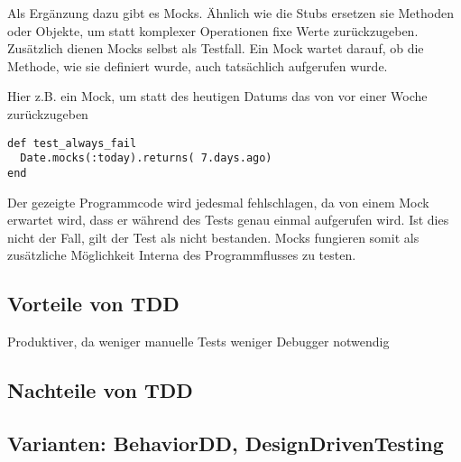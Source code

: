   Als Ergänzung dazu gibt es Mocks. Ähnlich wie die Stubs ersetzen sie Methoden oder Objekte, um statt komplexer Operationen fixe Werte zurückzugeben. Zusätzlich dienen Mocks selbst als Testfall. Ein Mock wartet darauf, ob die Methode, wie sie definiert wurde, auch tatsächlich aufgerufen wurde.
  
  Hier z.B. ein Mock, um statt des heutigen Datums das von vor einer Woche zurückzugeben
  \begin{lstlisting}
def test_always_fail
  Date.mocks(:today).returns( 7.days.ago)
end
  \end{lstlisting}
  Der gezeigte Programmcode wird jedesmal fehlschlagen, da von einem Mock erwartet wird, dass er während des Tests genau einmal aufgerufen wird. Ist dies nicht der Fall, gilt der Test als nicht bestanden. Mocks fungieren somit als zusätzliche Möglichkeit Interna des Programmflusses zu testen.

  
  \subsection{Vorteile von TDD}
  Produktiver, 
    da weniger manuelle Tests
    weniger Debugger notwendig
  
  
  
  \subsection{Nachteile von TDD}
  \subsection{Varianten: BehaviorDD, DesignDrivenTesting}